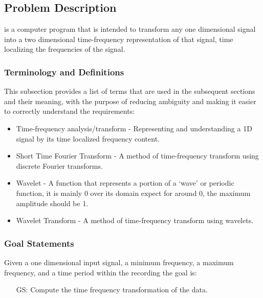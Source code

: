\documentclass[12pt]{article}
\newcounter{goalnum} %
\begin{document}
\subsection{Problem Description} \label{Sec_pd}

\progname{} is a computer program that is intended to transform any one dimensional signal into a two dimensional time-frequency representation of that signal, time localizing the frequencies of the signal. 

\subsubsection{Terminology and  Definitions}

This subsection provides a list of terms that are used in the subsequent
sections and their meaning, with the purpose of reducing ambiguity and making it
easier to correctly understand the requirements:

\begin{itemize}
\item Time-frequency analysis/transform - Representing and understanding a 1D signal by its time localized frequency content.
\item Short Time Fourier Transform - A method of time-frequency transform using discrete Fourier transforms.
\item Wavelet - A function that represents a portion of a `wave' or periodic function, it is mainly 0 over its domain expect for around 0, the maximum amplitude should be 1.
\item Wavelet Transform - A method of time-frequency transform using wavelets.

\end{itemize}

\subsubsection{Goal Statements} \label{goal_state}

\noindent Given a one dimensional input signal, a minimum frequency, a maximum frequency, and a time period within the recording the goal is:

\begin{itemize}

\item[GS\refstepcounter{goalnum}\thegoalnum \label{G_time_freq_transform}:] Compute the time frequency transformation of the data.

\end{itemize}
\end{document}
